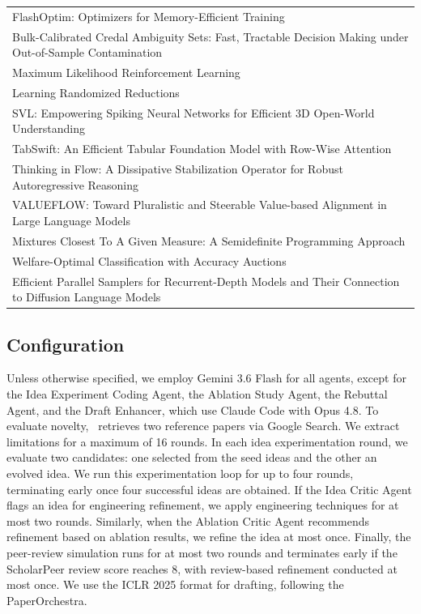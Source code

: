 \begin{table}[!ht]
{\begin{tabular}{l}
FlashOptim: Optimizers for Memory-Efficient Training \citep{ortiz2026flashoptim}\\
Bulk-Calibrated Credal Ambiguity Sets: Fast, Tractable Decision Making under Out-of-Sample Contamination \citep{chen2026bulkcalibrated}\\
Maximum Likelihood Reinforcement Learning \citep{tajwar2026maximum}\\
Learning Randomized Reductions \citep{erata2024learning}\\
SVL: Empowering Spiking Neural Networks for Efficient 3D Open-World Understanding \citep{qiu2026svl}\\
TabSwift: An Efficient Tabular Foundation Model with Row-Wise Attention \citep{liu2026tabswift}\\
Thinking in Flow: A Dissipative Stabilization Operator for Robust Autoregressive Reasoning \citep{huang2026thinking}\\
VALUEFLOW: Toward Pluralistic and Steerable Value-based Alignment in Large Language Models \citep{kim2026valueflow}\\
Mixtures Closest To A Given Measure: A Semidefinite Programming Approach \citep{durasinovic2026mixtures}\\
Welfare-Optimal Classification with Accuracy Auctions \citep{sadi2026welfareoptimal}\\
Efficient Parallel Samplers for Recurrent-Depth Models and Their Connection to Diffusion Language Models \citep{geiping2026efficient}\\
\bottomrule
\end{tabular}}
\end{table}

\newpage
\subsection{Configuration}\label{subapp:config}
Unless otherwise specified, we employ Gemini 3.6 Flash for all agents, except for the Idea Experiment Coding Agent, the Ablation Study Agent, the Rebuttal Agent, and the Draft Enhancer, which use Claude Code with Opus 4.8. To evaluate novelty, \sname~retrieves two reference papers via Google Search. We extract limitations for a maximum of 16 rounds. In each idea experimentation round, we evaluate two candidates: one selected from the seed ideas and the other an evolved idea. We run this experimentation loop for up to four rounds, terminating early once four successful ideas are obtained. If the Idea Critic Agent flags an idea for engineering refinement, we apply engineering techniques for at most two rounds. Similarly, when the Ablation Critic Agent recommends refinement based on ablation results, we refine the idea at most once. Finally, the peer-review simulation runs for at most two rounds and terminates early if the ScholarPeer review score reaches 8, with review-based refinement conducted at most once. We use the ICLR 2025 format for drafting, following the PaperOrchestra.





